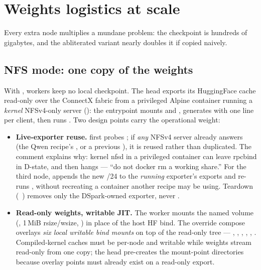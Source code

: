 \section{Weights logistics at scale}

Every extra node multiplies a mundane problem: the checkpoint is hundreds of
gigabytes, and the abliterated variant nearly doubles it if copied naively.

\subsection{NFS mode: one copy of the weights}

With , workers keep no local checkpoint. The
head exports its HuggingFace cache read-only over the ConnectX fabric from a
privileged Alpine container running a \emph{kernel} NFSv4-only server
(): the entrypoint mounts  and
, generates  with one line per
client, then runs . Two design points carry the operational
weight:

\begin{itemize}
\item \textbf{Live-exporter reuse.}  first probes
; if \emph{any} NFSv4 server already answers
(the Qwen recipe's , or a previous ), it
is reused rather than duplicated. The comment explains why: kernel nfsd in a
privileged container can leave rpcbind in D-state, and then
 hangs --- ``do not docker rm a working share.'' For the
third node,  appends the new /24 to the \emph{running}
exporter's exports and re-runs , without recreating a
container another recipe may be using. Teardown
(~) removes only the
DSpark-owned exporter, never .
\item \textbf{Read-only weights, writable JIT.} The worker mounts the named
volume  (, 1\,MiB
rsize/wsize, ) in place of the host HF bind. The
override compose overlays \emph{six local writable bind mounts} on top of the
read-only tree --- , ,
, , ,
. Compiled-kernel caches must be per-node and writable while
weights stream read-only from one copy; the head pre-creates the mount-point
directories because overlay points must already exist on a read-only export.
\end{itemize}

